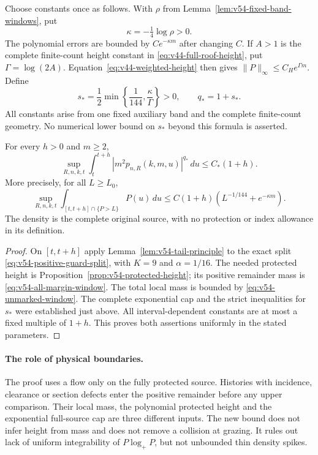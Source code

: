 Choose constants once as follows. With $\rho$ from
Lemma~\ref{lem:v54-fixed-band-windows}, put
\[
 \kappa=-\tfrac14\log\rho>0.
\]
The polynomial errors are bounded by $C e^{-\kappa m}$ after
changing $C$. If $A>1$ is the complete finite-count height constant
in \eqref{eq:v44-full-roof-height}, put $\Gamma=\log(2A)$.
Equation~\eqref{eq:v44-weighted-height} then gives
$\|P\|_\infty\le C_H e^{\Gamma m}$. Define
\begin{equation}\label{eq:v54-admissible-exponent}
 s_* =\frac12\min\left\{\frac1{144},\frac{\kappa}{\Gamma}\right\}>0,
 \qquad q_*=1+s_*.
\end{equation}
All constants arise from one fixed auxiliary band and the complete
finite-count geometry. No numerical lower bound on $s_*$ beyond this
formula is asserted.

\begin{theorem}
\label{thm:v54-uniform-integrability}
For every $h>0$ and $m\ge2$,
\begin{equation}\label{eq:v54-uniform-integrability}
 \sup_{R,n,k,t}\int_t^{t+h}
                 |m^2p_{n,R}(k,m,u)|^{q_*}\,du\le C_*(1+h).
\end{equation}
More precisely, for all $L\ge L_0$,
\begin{equation}\label{eq:v54-physical-height-tail}
 \sup_{R,n,k,t}\int_{[t,t+h]\cap\{P>L\}}P(u)\,du
 \le C(1+h)(L^{-1/144}+e^{-\kappa m}).
\end{equation}
The density is the complete original source, with no protection or
index allowance in its definition.
\end{theorem}
\begin{proof}
On $[t,t+h]$ apply Lemma~\ref{lem:v54-tail-principle} to the exact
split \eqref{eq:v54-positive-guard-split}, with $K=9$ and
$\alpha=1/16$. The needed protected height is
Proposition~\ref{prop:v54-protected-height}; its positive remainder
mass is \eqref{eq:v54-all-margin-window}. The total local mass is
bounded by \eqref{eq:v54-unmarked-window}. The complete exponential
cap and the strict inequalities for $s_*$ were established just above.
All interval-dependent constants are at most a fixed multiple of
$1+h$. This proves both assertions uniformly in the stated parameters.
\end{proof}

\paragraph{The role of physical boundaries.}
The proof uses a flow only on the fully protected source. Histories
with incidence, clearance or section defects enter the positive
remainder before any upper comparison. Their local mass, the polynomial
protected height and the exponential full-source cap are three
different inputs. The new bound does not infer height from mass and
does not remove a collision at grazing. It rules out lack of uniform
integrability of $P\log_+P$, but not unbounded thin density spikes.
